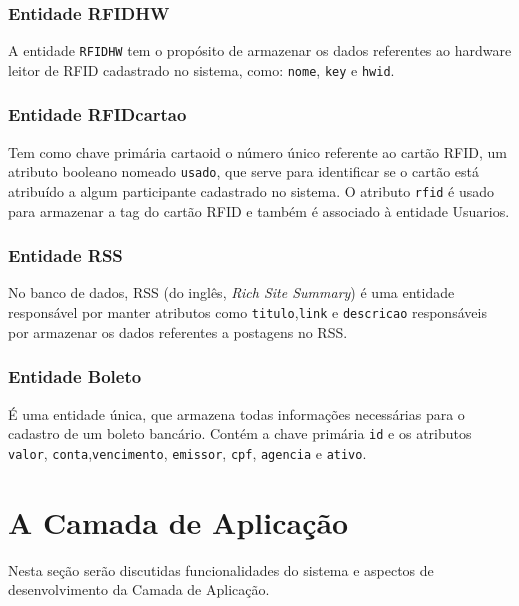 \documentclass[tcc,capa]{texufpel}
\begin{document}
        \subsubsection{Entidade RFID\underline{\hspace{.10in}}HW}
            A entidade \texttt{RFID\underline{\hspace{.10in}}HW} tem o propósito de armazenar os dados referentes ao hardware leitor de RFID cadastrado no sistema, como: \texttt{nome}, \texttt{key} e \texttt{hw\underline{\hspace{.10in}}id}. 
        
        \subsubsection{Entidade RFID\underline{\hspace{.10in}}cartao}
            Tem como chave primária cartao\underline{\hspace{.10in}}id o número único referente ao cartão RFID, um atributo booleano nomeado \texttt{usado}, que serve para identificar se o cartão está atribuído a algum participante cadastrado no sistema. O atributo \texttt{rfid} é usado para  armazenar a tag do cartão RFID e também é associado à entidade Usuarios.
        
        \subsubsection{Entidade RSS}
            No banco de dados, RSS (do inglês, \textit{Rich Site Summary})  é uma entidade responsável por manter atributos como \texttt{titulo},\texttt{link} e \texttt{descricao} responsáveis por armazenar os dados referentes a postagens no RSS.
        
        \subsubsection{Entidade Boleto}
            É uma entidade única, que armazena todas informações necessárias para o cadastro de um boleto bancário. Contém a chave primária \texttt{id} e os atributos \texttt{valor}, \texttt{conta},\texttt{vencimento}, \texttt{emissor}, \texttt{cpf}, \texttt{agencia} e \texttt{ativo}.
    
    
    \section{A Camada de Aplicação}
        Nesta seção serão discutidas funcionalidades do sistema e aspectos de desenvolvimento da Camada de Aplicação.
        
\end{document}
